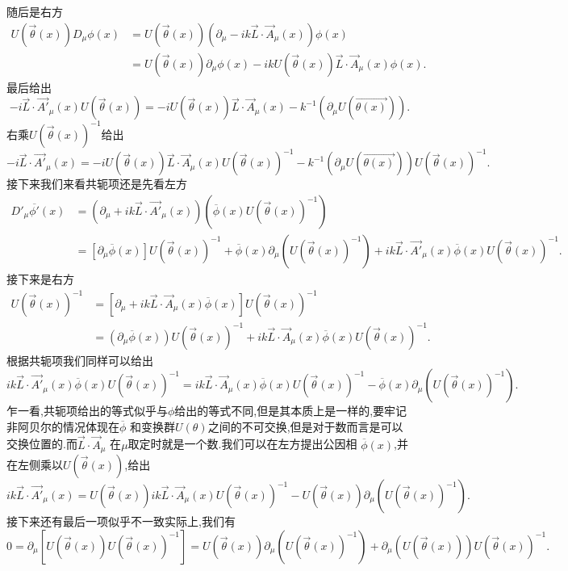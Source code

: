 \documentclass[../main.tex]{subfiles}
\begin{document}
 随后是右方
 \begin{align*}
 U(\vec{\theta}(x)) D_\mu \phi(x) &= U(\vec{\theta}(x))(\partial_\mu - ik \vec{L}\cdot \vec{A}_\mu(x))\phi(x) \\
                                  & = U(\vec{\theta}(x))\partial_\mu \phi(x) - ik U(\vec{\theta}(x))\vec{L}\cdot\vec{A}_\mu(x)  \phi(x)
 .\end{align*}
 最后给出\[
- i  \vec{L} \cdot\vec{A'}_\mu(x)U(\vec{\theta}(x)) = -i U(\vec{\theta}(x))\vec{L} \cdot \vec{A}_\mu(x)   - k^{-1}(\partial_\mu U(\vec{\theta(x)}))
 .\] 
 右乘$U(\vec{\theta}(x))^{-1}$给出\[
- i  \vec{L} \cdot\vec{A'}_\mu(x) = -i U(\vec{\theta}(x))\vec{L} \cdot \vec{A}_\mu(x) U(\vec{\theta}(x))^{-1}  - k^{-1}(\partial_\mu U(\vec{\theta(x)}))U(\vec{\theta}(x))^{-1}
 .\] 
 接下来我们来看共轭项还是先看左方
 \begin{align*}
 D'_\mu \overline{\phi'}(x)&=  (\partial_\mu + ik \vec{L}\cdot \vec{A'}_\mu(x))(\overline{\phi}(x) U(\vec{\theta}(x))^{-1})\\
        & = [\partial_\mu \overline{\phi}(x)]U(\vec{\theta}(x))^{-1} + \overline{\phi}(x) \partial_\mu(U(\vec{\theta}(x))^{-1}) + ik \vec{L}\cdot \vec{A'}_\mu(x)\overline{\phi}(x) U(\vec{\theta}(x))^{-1}
 .\end{align*}
 接下来是右方
 \begin{align*}
 [D_\mu \overline{\phi}(x)]U (\vec{\theta}(x))^{-1}& = [\partial_\mu + ik \vec{L}\cdot \vec{A}_\mu(x) \overline{\phi}(x)]U(\vec{\theta}(x))^{-1}\\
                                                   & = (\partial_\mu \overline{\phi}(x))U(\vec{\theta}(x))^{-1} + ik \vec{L}\cdot \vec{A}_\mu(x) \overline{\phi}(x)U(\vec{\theta}(x))^{-1}
 .\end{align*}
 根据共轭项我们同样可以给出
 \[
  ik \vec{L}\cdot \vec{A'}_\mu(x)\overline{\phi}(x) U(\vec{\theta}(x))^{-1}
 =ik \vec{L}\cdot \vec{A}_\mu(x) \overline{\phi}(x)U(\vec{\theta}(x))^{-1} - \overline{\phi}(x) \partial_\mu(U(\vec{\theta}(x))^{-1}) 
 .\] 
 乍一看,共轭项给出的等式似乎与$\phi$给出的等式不同,但是其本质上是一样的,要牢记非阿贝尔的情况体现在$\overline{\phi}$ 和变换群$U(\theta)$之间的不可交换,但是对于数而言是可以交换位置的.而$\vec{L} \cdot \vec{A}_\mu$ 在$\mu$取定时就是一个数.我们可以在左方提出公因相 $\overline{\phi}(x)$,并在左侧乘以$U(\vec{\theta}(x))$,给出\[
  ik \vec{L}\cdot \vec{A'}_\mu(x)
 =U(\vec{\theta}(x))ik \vec{L}\cdot \vec{A}_\mu(x)U(\vec{\theta}(x))^{-1} - U(\vec{\theta}(x)) \partial_\mu(U(\vec{\theta}(x))^{-1}) 
 .\] 
 接下来还有最后一项似乎不一致实际上,我们有\[
 0 = \partial_\mu[U(\vec{\theta}(x))U(\vec{\theta}(x))^{-1}] = U(\vec{\theta}(x)) \partial_\mu(U(\vec{\theta}(x))^{-1})  +  \partial_\mu(U(\vec{\theta}(x)))U(\vec{\theta}(x))^{-1}
 .\] 
\end{document}

